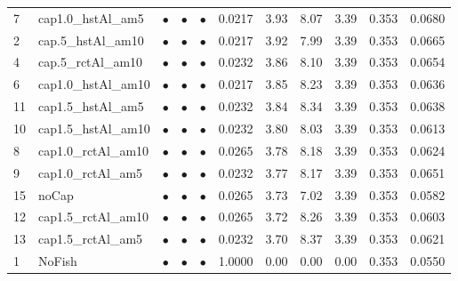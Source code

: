 \documentclass[11pt]{book}
\begin{document}
\begin{landscape}
\begin{longtable}[t]{llccccccccc}
7 & cap1.0\_hstAl\_am5 & $\bullet$ & $\bullet$ & $\bullet$ & 0.0217 & 3.93 & 8.07 & 3.39 & 0.353 & 0.0680\\
2 & cap.5\_hstAl\_am10 & $\bullet$ & $\bullet$ & $\bullet$ & 0.0217 & 3.92 & 7.99 & 3.39 & 0.353 & 0.0665\\
4 & cap.5\_rctAl\_am10 & $\bullet$ & $\bullet$ & $\bullet$ & 0.0232 & 3.86 & 8.10 & 3.39 & 0.353 & 0.0654\\
6 & cap1.0\_hstAl\_am10 & $\bullet$ & $\bullet$ & $\bullet$ & 0.0217 & 3.85 & 8.23 & 3.39 & 0.353 & 0.0636\\
11 & cap1.5\_hstAl\_am5 & $\bullet$ & $\bullet$ & $\bullet$ & 0.0232 & 3.84 & 8.34 & 3.39 & 0.353 & 0.0638\\
10 & cap1.5\_hstAl\_am10 & $\bullet$ & $\bullet$ & $\bullet$ & 0.0232 & 3.80 & 8.03 & 3.39 & 0.353 & 0.0613\\
8 & cap1.0\_rctAl\_am10 & $\bullet$ & $\bullet$ & $\bullet$ & 0.0265 & 3.78 & 8.18 & 3.39 & 0.353 & 0.0624\\
9 & cap1.0\_rctAl\_am5 & $\bullet$ & $\bullet$ & $\bullet$ & 0.0232 & 3.77 & 8.17 & 3.39 & 0.353 & 0.0651\\
15 & noCap & $\bullet$ & $\bullet$ & $\bullet$ & 0.0265 & 3.73 & 7.02 & 3.39 & 0.353 & 0.0582\\
12 & cap1.5\_rctAl\_am10 & $\bullet$ & $\bullet$ & $\bullet$ & 0.0265 & 3.72 & 8.26 & 3.39 & 0.353 & 0.0603\\
13 & cap1.5\_rctAl\_am5 & $\bullet$ & $\bullet$ & $\bullet$ & 0.0232 & 3.70 & 8.37 & 3.39 & 0.353 & 0.0621\\
1 & NoFish & $\bullet$ & $\bullet$ & $\bullet$ & 1.0000 & 0.00 & 0.00 & 0.00 & 0.353 & 0.0550\\*
\end{longtable}
\end{landscape}
\endgroup{}

\newpage
\end{document}

